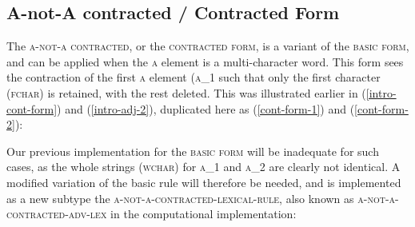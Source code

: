 \documentclass[12pt, UTF8]{article}
\begin{document}
\subsection{A-not-A contracted / Contracted Form}

The \textsc{a-not-a contracted}, or the \textsc{contracted form}, is a variant of the \textsc{basic form}, and can be applied when the \textsc{a} element is a multi-character word. This form sees the contraction of the first \textsc{a} element (\textsc{a_1} such that only the first character (\textsc{fchar}) is retained, with the rest deleted. This was illustrated earlier in (\ref{intro-cont-form}) and (\ref{intro-adj-2}), duplicated here as (\ref{cont-form-1}) and (\ref{cont-form-2}):

\begin{exe}

\end{exe}

Our previous implementation for the \textsc{basic form} will be inadequate for such cases, as the whole strings (\textsc{wchar}) for \textsc{a_1} and \textsc{a_2} are clearly not identical. A modified variation of the basic rule will therefore be needed, and is implemented as a new subtype the \textsc{a-not-a-contracted-lexical-rule}, also known as \textsc{a-not-a-contracted-adv-lex} in the computational implementation:

\begin{exe}


\end{exe}
\end{document}
